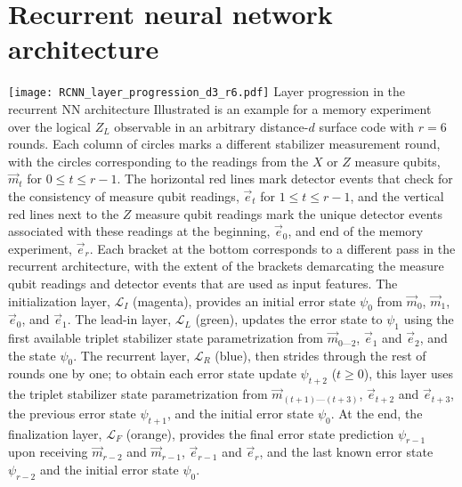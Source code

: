 \section{Recurrent neural network architecture}

\begin{figure*}[htb]
\centering
\texttt{[image: RCNN\_layer\_progression\_d3\_r6.pdf]}
\ccaption
{Layer progression in the recurrent NN architecture}
{
Illustrated is an example for a memory experiment over the logical $Z_L$ observable in an arbitrary distance-$d$ surface code with $r=6$ rounds. Each column of circles marks a different stabilizer measurement round, with the circles corresponding to the readings from the $X$ or $Z$ measure qubits, $\vec{m}_t$ for $0\leq t \leq r-1$. The horizontal red lines mark detector events that check for the consistency of measure qubit readings, $\vec{e}_t$ for $1 \leq t \leq r-1$, and the vertical red lines next to the $Z$ measure qubit readings mark the unique detector events associated with these readings at the beginning, $\vec{e}_0$, and end of the memory experiment, $\vec{e}_{r}$.
Each bracket at the bottom corresponds to a different pass in the recurrent architecture, with the extent of the brackets demarcating the measure qubit readings and detector events that are used as input features.
The initialization layer, $\mathcal{L}_I$ (magenta), provides an initial error state $\psi_0$ from $\vec{m}_0$, $\vec{m}_1$, $\vec{e}_0$, and $\vec{e}_1$.
The lead-in layer, $\mathcal{L}_L$ (green), updates the error state to $\psi_1$ using the first available triplet stabilizer state parametrization from $\vec{m}_{0 \text{---} 2}$, $\vec{e}_1$ and $\vec{e}_2$, and the state $\psi_0$.
The recurrent layer, $\mathcal{L}_R$ (blue), then strides through the rest of rounds one by one; to obtain each error state update $\psi_{t+2}$ ($t\geq0$), this layer uses the triplet stabilizer state parametrization from $\vec{m}_{(t+1) \text{---} (t+3)}$, $\vec{e}_{t+2}$ and $\vec{e}_{t+3}$, the previous error state $\psi_{t+1}$, and the initial error state $\psi_{0}$.
At the end, the finalization layer, $\mathcal{L}_F$ (orange), provides the final error state prediction $\psi_{r-1}$ upon receiving $\vec{m}_{r-2}$ and $\vec{m}_{r-1}$, $\vec{e}_{r-1}$ and $\vec{e}_r$, and the last known error state $\psi_{r-2}$ and the initial error state $\psi_{0}$.
}
\label{fig:RCNN-layer-prog}
\end{figure*}
